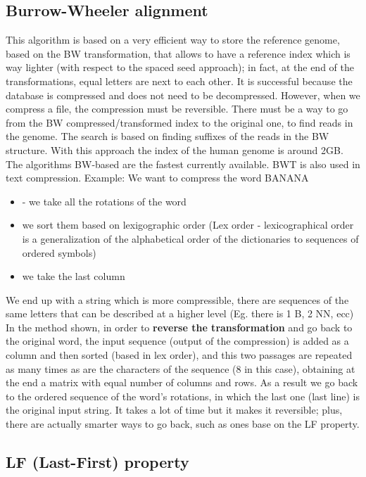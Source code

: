 \subsection{Burrow-Wheeler alignment}
This algorithm is based on a very efficient way to store the reference genome, based on the BW transformation, that allows to have a reference index which is way lighter (with respect to the spaced seed approach); in fact, at the end of the transformations, equal letters are next to each other. It is successful because the database is compressed and does not need to be decompressed. However, when we compress a file, the compression must be reversible. There must be a way to go from the BW compressed/transformed index to the original one, to find reads in the genome. 
The search is based on finding suffixes of the reads in the BW structure. With this approach the index of the human genome is around 2GB. The algorithms BW-based are the fastest currently available. 
BWT is also used in text compression.
Example:
We want to compress the word BANANA
\begin{itemize}
    \item - we take all the rotations of the word
    \item we sort them based on lexigographic order (Lex order - lexicographical order is a generalization of the alphabetical order of the dictionaries to sequences of ordered symbols) 
    \item we take the last column
\end{itemize}

We end up with a string which is more compressible, there are sequences of the same letters that can be described at a higher level (Eg. there is 1 B, 2 NN, ecc)
In the method shown, in order to \textbf{reverse the transformation} and go back to the original word, the input sequence (output of the compression) is added as a column and then sorted (based in lex order), and this two passages are repeated as many times as are the characters of the sequence (8 in this case), obtaining at the end a matrix with equal number of columns and rows. As a result we go back to the ordered sequence of the word's rotations, in which the last one (last line) is the original input string. 
It takes a lot of time but it makes it reversible; plus, there are actually smarter ways to go back, such as ones base on the LF property.

\subsection{LF (Last-First) property}

